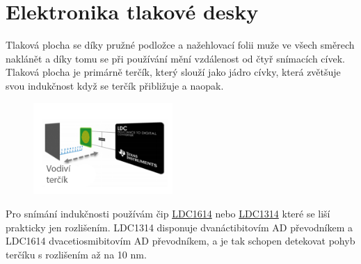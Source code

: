 \section*{Elektronika tlakové desky}

Tlaková plocha se díky pružné podložce a nažehlovací folii muže ve všech směrech naklánět a díky tomu se při používání mění vzdálenost od čtyř snímacích
cívek. Tlaková plocha je primárně terčík, který slouží jako jádro cívky, která zvětšuje svou indukčnost když se terčík přibližuje a naopak.

\begin{figure}[htbp]
    \centering
    \includegraphics[width=200]{kapitoly/obrazky/E4/elektronika_tlakove_desky/civka_tercik_LDC.png}
    \caption{}
    \label{fig:M1}
\end{figure}

Pro snímání indukčnosti používám čip \href{https://www.ti.com/lit/ds/symlink/ldc1612.pdf?ts=1612018658531&ref_url=https%253A%252F%252Fwww.google.com%252F}{LDC1614}
nebo \href{https://www.ti.com/lit/ds/symlink/ldc1312.pdf?ts=1612017390818&ref_url=https%253A%252F%252Fwww.google.com%252F}{LDC1314} 
které se liší prakticky jen rozlišením. LDC1314 disponuje dvanáctibitovím AD převodníkem a LDC1614 dvacetiosmibitovím AD převodníkem, 
a je tak schopen detekovat pohyb terčíku s rozlišením až na 10 nm.

